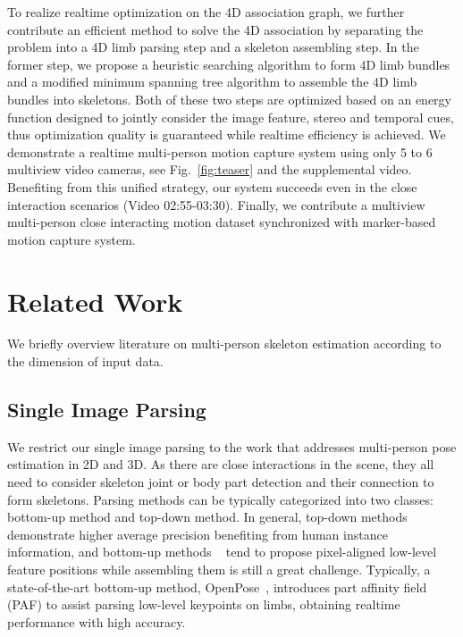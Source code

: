 \documentclass[10pt,twocolumn,letterpaper]{article}
\begin{document}
To realize realtime optimization on the 4D association graph, we further contribute an efficient method to solve the 4D association by separating the problem into a 4D limb parsing step and a skeleton assembling step. In the former step, we propose a heuristic searching algorithm to form 4D limb bundles and a modified minimum spanning tree algorithm to assemble the 4D limb bundles into skeletons. Both of these two steps are optimized based on an energy function designed to jointly consider the image feature, stereo and temporal cues, thus optimization quality is guaranteed while realtime efficiency is achieved. We demonstrate a realtime multi-person motion capture system using only 5 to 6 multiview video cameras, see Fig.~\ref{fig:teaser} and the supplemental video. Benefiting from this unified strategy, our system succeeds even in the close interaction scenarios (Video 02:55-03:30). Finally, we contribute a multiview multi-person close interacting motion dataset synchronized with marker-based motion capture system.









%
 \section{Related Work}
We briefly overview literature on multi-person skeleton estimation according to the dimension of input data.
\subsection{Single Image Parsing}
We restrict our single image parsing to the work that addresses multi-person pose estimation in 2D and 3D. As there are close interactions in the scene, they all need to consider skeleton joint or body part detection and their connection to form skeletons. Parsing methods can be typically categorized into two classes: bottom-up method and top-down method. In general, top-down methods \cite{ke2018multi,fang2017rmpe,Chen2018CPN,he2017mask,xiao2018simple,li2018crowdpose} demonstrate higher average precision benefiting from human instance information, and bottom-up methods ~\cite{deepercut,cao2018openpose,papandreou2018personlab,kocabas2018multiposenet,Jie:graph:decomposition} tend to propose pixel-aligned low-level feature positions while assembling them is still a great challenge.
Typically, a state-of-the-art bottom-up method, OpenPose~\cite{cao2018openpose}, introduces part affinity field (PAF) to assist parsing low-level keypoints on limbs, obtaining realtime performance with high accuracy.
\end{document}
